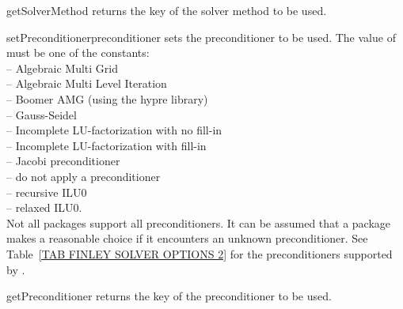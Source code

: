 \begin{methoddesc}[SolverOptions]{getSolverMethod}{}
returns the key of the solver method to be used. 
\end{methoddesc}

\begin{methoddesc}[SolverOptions]{setPreconditioner}{preconditioner}
sets the preconditioner to be used.
The value of  must be one of the constants:\\
  -- Algebraic Multi Grid\\
  -- Algebraic Multi Level Iteration\\
  -- Boomer AMG (using the hypre library)\\
  -- Gauss-Seidel\\
  -- Incomplete LU-factorization with no fill-in\\
  -- Incomplete LU-factorization with fill-in\\
  -- Jacobi preconditioner\\
  -- do not apply a preconditioner\\
  -- recursive ILU0\\
  -- relaxed ILU0.\\
Not all packages support all preconditioners. It can be assumed that a package
makes a reasonable choice if it encounters an unknown preconditioner.
See Table~\ref{TAB FINLEY SOLVER OPTIONS 2} for the preconditioners supported
by \finley.
\end{methoddesc}
   
\begin{methoddesc}[SolverOptions]{getPreconditioner}{}
returns the key of the preconditioner to be used.
\end{methoddesc}

